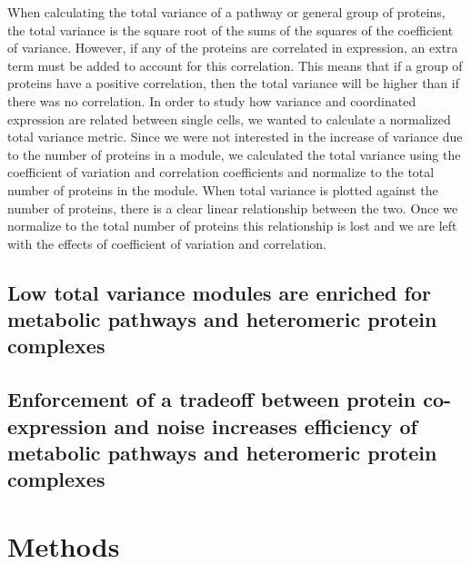 \documentclass[11pt,]{article}
\begin{document}
When calculating the total variance of a pathway or general group of
proteins, the total variance is the square root of the sums of the
squares of the coefficient of variance. However, if any of the proteins
are correlated in expression, an extra term must be added to account for
this correlation. This means that if a group of proteins have a positive
correlation, then the total variance will be higher than if there was no
correlation. In order to study how variance and coordinated expression
are related between single cells, we wanted to calculate a normalized
total variance metric. Since we were not interested in the increase of
variance due to the number of proteins in a module, we calculated the
total variance using the coefficient of variation and correlation
coefficients and normalize to the total number of proteins in the
module. When total variance is plotted against the number of proteins,
there is a clear linear relationship between the two. Once we normalize
to the total number of proteins this relationship is lost and we are
left with the effects of coefficient of variation and correlation.

\hypertarget{low-total-variance-modules-are-enriched-for-metabolic-pathways-and-heteromeric-protein-complexes}{%
\subsection{Low total variance modules are enriched for metabolic
pathways and heteromeric protein
complexes}\label{low-total-variance-modules-are-enriched-for-metabolic-pathways-and-heteromeric-protein-complexes}}

\hypertarget{enforcement-of-a-tradeoff-between-protein-co-expression-and-noise-increases-efficiency-of-metabolic-pathways-and-heteromeric-protein-complexes}{%
\subsection{Enforcement of a tradeoff between protein co-expression and
noise increases efficiency of metabolic pathways and heteromeric protein
complexes}\label{enforcement-of-a-tradeoff-between-protein-co-expression-and-noise-increases-efficiency-of-metabolic-pathways-and-heteromeric-protein-complexes}}

\hypertarget{methods}{%
\section{Methods}\label{methods}}
\end{document}
